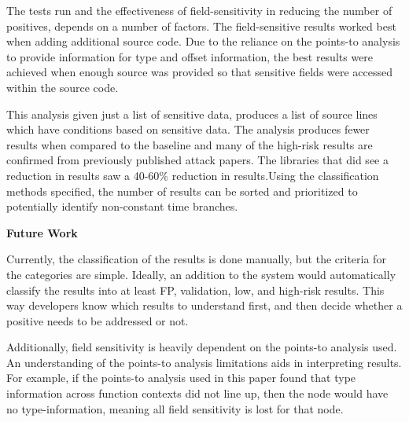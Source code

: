   The tests run and the effectiveness of field-sensitivity in reducing the
   number of positives, depends on a number of factors. The field-sensitive
   results worked best when adding additional source code. Due to the reliance
   on the points-to analysis to provide information for type and offset
   information, the best results were achieved when enough source was provided
   so that sensitive fields were accessed within the source code.

   This analysis given just a list of sensitive data, produces a list of source
   lines which have conditions based on sensitive data. The analysis produces
   fewer results when compared to the baseline and many of the high-risk results
   are confirmed from previously published attack papers. The libraries that did
   see a reduction in results saw a 40-60\% reduction in results.Using the
   classification methods specified, the number of results can be sorted and
   prioritized to potentially identify non-constant time branches.


   \noindent
   \textbf{Future Work}

   Currently, the classification of the results is done manually, but the
   criteria for the categories are simple. Ideally, an addition to the system
   would automatically classify the results into at least FP, validation, low,
   and high-risk results. This way developers know which results to understand
   first, and then decide whether a positive needs to be addressed or not.

   Additionally, field sensitivity is heavily dependent on the points-to
   analysis used. An understanding of the points-to analysis limitations aids in
   interpreting results. For example, if the points-to analysis used in this
   paper found that type information across function contexts did not line up,
   then the node would have no type-information, meaning all field sensitivity is
   lost for that node.
